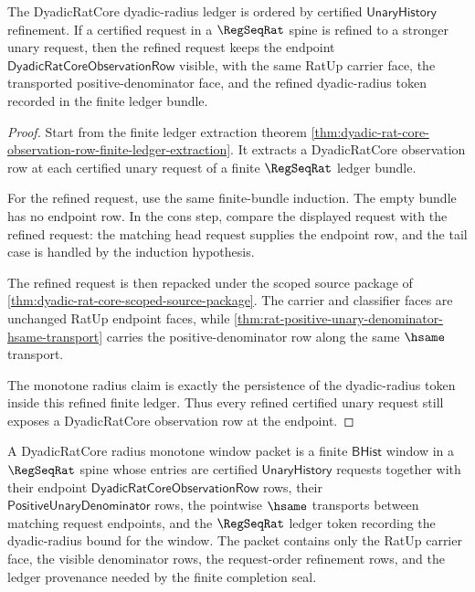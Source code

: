 \begin{theorem}
\label{thm:dyadic-rat-core-radius-monotonicity-obligation}
The DyadicRatCore dyadic-radius ledger is ordered by certified
$\mathsf{UnaryHistory}$ refinement. If a certified request in a $\RegSeqRat$
spine is refined to a stronger unary request, then the refined request keeps
the endpoint $\mathsf{DyadicRatCoreObservationRow}$ visible, with the same
RatUp carrier face, the transported positive-denominator face, and the refined
dyadic-radius token recorded in the finite ledger bundle.
\end{theorem}
\begin{proof}
Start from the finite ledger extraction theorem
\autoref{thm:dyadic-rat-core-observation-row-finite-ledger-extraction}. It
extracts a DyadicRatCore observation row at each certified unary request of a
finite $\RegSeqRat$ ledger bundle.

For the refined request, use the same finite-bundle induction. The empty bundle
has no endpoint row. In the cons step, compare the displayed request with the
refined request: the matching head request supplies the endpoint row, and the
tail case is handled by the induction hypothesis.

The refined request is then repacked under the scoped source package of
\autoref{thm:dyadic-rat-core-scoped-source-package}. The carrier and
classifier faces are unchanged RatUp endpoint faces, while
\autoref{thm:rat-positive-unary-denominator-hsame-transport} carries the
positive-denominator row along the same $\hsame$ transport.

The monotone radius claim is exactly the persistence of the dyadic-radius token
inside this refined finite ledger. Thus every refined certified unary request
still exposes a DyadicRatCore observation row at the endpoint.
\end{proof}

\begin{definition}
\label{def:dyadic-rat-core-radius-monotone-window-packet}
A DyadicRatCore radius monotone window packet is a finite $\mathsf{BHist}$
window in a $\RegSeqRat$ spine whose entries are certified
$\mathsf{UnaryHistory}$ requests together with their endpoint
$\mathsf{DyadicRatCoreObservationRow}$ rows, their
$\mathsf{PositiveUnaryDenominator}$ rows, the pointwise $\hsame$ transports
between matching request endpoints, and the $\RegSeqRat$ ledger token recording
the dyadic-radius bound for the window. The packet contains only the RatUp
carrier face, the visible denominator rows, the request-order refinement rows,
and the ledger provenance needed by the finite completion seal.
\end{definition}

